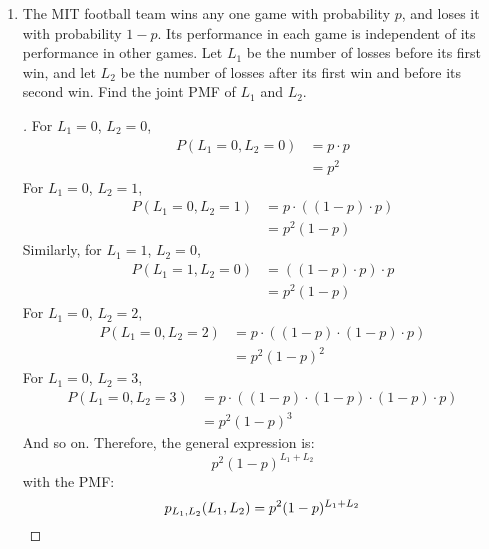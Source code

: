 \documentclass[paper=usletter, fontsize=12pt]{article}
\begin{document}
\begin{enumerate}[label=\textbf{\arabic*}.]
\begin{enumerate}[label=(\alph*)]
        \end{enumerate}

        \item
        The MIT football team wins any one game with probability $p$, and loses
        it with probability $1 - p$. Its performance in each game is
        independent of its performance in other games. Let $L_1$ be the number
        of losses before its first win, and let $L_2$ be the number of losses
        after its first win and before its second win. Find the joint PMF of
        $L_1$ and $L_2$.
        \begin{proof}[\unskip\nopunct]
            For $L_1=0$, $L_2=0$,\\
            \begin{align*}
                P(L_1=0, L_2=0) & = p \cdot p \\
                & = p^2
            \end{align*}
            For $L_1=0$, $L_2=1$,\\
            \begin{align*}
                P(L_1=0, L_2=1) & = p \cdot ((1-p) \cdot p)  \\
                & = p^2(1-p)
            \end{align*}
            Similarly, for $L_1=1$, $L_2=0$,\\
            \begin{align*}
                P(L_1=1, L_2=0) & = ((1-p) \cdot p) \cdot p  \\
                & = p^2(1-p)
            \end{align*}
            For $L_1=0$, $L_2=2$,\\
            \begin{align*}
                P(L_1=0, L_2=2) & = p \cdot ((1-p) \cdot (1-p) \cdot p)  \\
                & = p^2(1-p)^2
            \end{align*}
            For $L_1=0$, $L_2=3$,\\
            \begin{align*}
                P(L_1=0, L_2=3) & = p \cdot ((1-p) \cdot (1-p) \cdot (1-p) \cdot p)  \\
                & = p^2(1-p)^3
            \end{align*}
            And so on. Therefore, the general expression is:
            \begin{equation*}
                p^2(1-p)^{L_1+L_2}
            \end{equation*}
            with the PMF:
            \begin{equation*}
                p_{L_1,L_2}(L_1,L_2) = p^2(1-p)^{L_1+L_2} \qedhere
            \end{equation*}
        \end{proof}
        \vspace{0.2in}


\end{enumerate}
\end{document}
